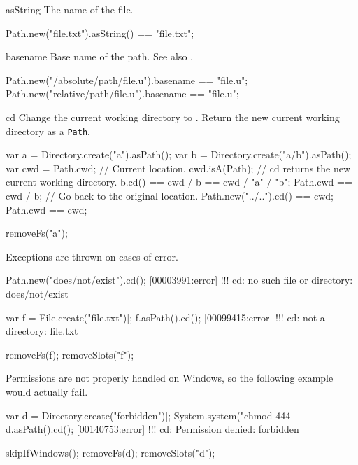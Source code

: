 \begin{urbiscriptapi}
\item[asString]
  The name of the file.
\begin{urbiassert}
Path.new("file.txt").asString() == "file.txt";
\end{urbiassert}


\item[basename]%
  Base name of the path.  See also .
\begin{urbiassert}
Path.new("/absolute/path/file.u").basename == "file.u";
Path.new("relative/path/file.u").basename  == "file.u";
\end{urbiassert}


\item[cd]%
  Change the current working directory to \this. Return the new current
  working directory as a \lstinline|Path|.
\begin{urbiassert}
var a = Directory.create("a").asPath();
var b = Directory.create("a/b").asPath();
var cwd = Path.cwd;     // Current location.
cwd.isA(Path);
// cd returns the new current working directory.
b.cd() == cwd / b == cwd / "a" / "b";
Path.cwd == cwd / b;
// Go back to the original location.
Path.new("../..").cd() == cwd;
Path.cwd == cwd;
\end{urbiassert}
\begin{urbicomment}
removeFs("a");
\end{urbicomment}

Exceptions are thrown on cases of error.
\begin{urbiscript}
Path.new("does/not/exist").cd();
[00003991:error] !!! cd: no such file or directory: does/not/exist

var f = File.create("file.txt")|;
f.asPath().cd();
[00099415:error] !!! cd: not a directory: file.txt
\end{urbiscript}
\begin{urbicomment}
removeFs(f);
removeSlots("f");
\end{urbicomment}

Permissions are not properly handled on Windows, so the following example
would actually fail.
\begin{urbiscript}[firstnumber=1]
var d = Directory.create("forbidden")|;
System.system("chmod 444 %
d.asPath().cd();
[00140753:error] !!! cd: Permission denied: forbidden
\end{urbiscript}
\begin{urbicomment}
skipIfWindows();
removeFs(d);
removeSlots("d");
\end{urbicomment}


\end{urbiscriptapi}
